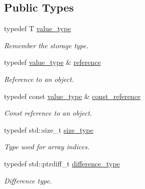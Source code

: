 \subsection*{Public Types}
\begin{DoxyCompactItemize}
\item 
\hypertarget{classhdnum_1_1Array_ae77aae65dae609c72534babc774dd152}{
typedef T \hyperlink{classhdnum_1_1Array_ae77aae65dae609c72534babc774dd152}{value\_\-type}}
\label{classhdnum_1_1Array_ae77aae65dae609c72534babc774dd152}

\begin{DoxyCompactList}\small\item\em Remember the storage type. \item\end{DoxyCompactList}\item 
\hypertarget{classhdnum_1_1Array_a5c1db6b52b2f88c3618040f856bdcdbe}{
typedef \hyperlink{classhdnum_1_1Array_ae77aae65dae609c72534babc774dd152}{value\_\-type} \& \hyperlink{classhdnum_1_1Array_a5c1db6b52b2f88c3618040f856bdcdbe}{reference}}
\label{classhdnum_1_1Array_a5c1db6b52b2f88c3618040f856bdcdbe}

\begin{DoxyCompactList}\small\item\em Reference to an object. \item\end{DoxyCompactList}\item 
\hypertarget{classhdnum_1_1Array_ad696c724bcda975ea63492d0786a1509}{
typedef const \hyperlink{classhdnum_1_1Array_ae77aae65dae609c72534babc774dd152}{value\_\-type} \& \hyperlink{classhdnum_1_1Array_ad696c724bcda975ea63492d0786a1509}{const\_\-reference}}
\label{classhdnum_1_1Array_ad696c724bcda975ea63492d0786a1509}

\begin{DoxyCompactList}\small\item\em Const reference to an object. \item\end{DoxyCompactList}\item 
\hypertarget{classhdnum_1_1Array_a52bad04c045624e4240073f8efb2e8e1}{
typedef std::size\_\-t \hyperlink{classhdnum_1_1Array_a52bad04c045624e4240073f8efb2e8e1}{size\_\-type}}
\label{classhdnum_1_1Array_a52bad04c045624e4240073f8efb2e8e1}

\begin{DoxyCompactList}\small\item\em Type used for array indices. \item\end{DoxyCompactList}\item 
\hypertarget{classhdnum_1_1Array_abb53f0f2fda2009c75602e374de9c0d7}{
typedef std::ptrdiff\_\-t \hyperlink{classhdnum_1_1Array_abb53f0f2fda2009c75602e374de9c0d7}{difference\_\-type}}
\label{classhdnum_1_1Array_abb53f0f2fda2009c75602e374de9c0d7}

\begin{DoxyCompactList}\small\item\em Difference type. \item\end{DoxyCompactList}\end{DoxyCompactItemize}

